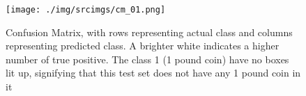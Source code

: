 \documentclass[main.tex]{subfiles}
\begin{document}
\begin{figure}[!h]
  \centering
  \texttt{[image: ./img/srcimgs/cm\_01.png]}
  \caption{Confusion Matrix, with rows representing actual class and columns representing predicted class. A brighter white indicates a higher number of true positive. The class 1 (1 pound coin) have no boxes lit up, signifying that this test set does not have any 1 pound coin in it}
\end{figure}
\end{document}
